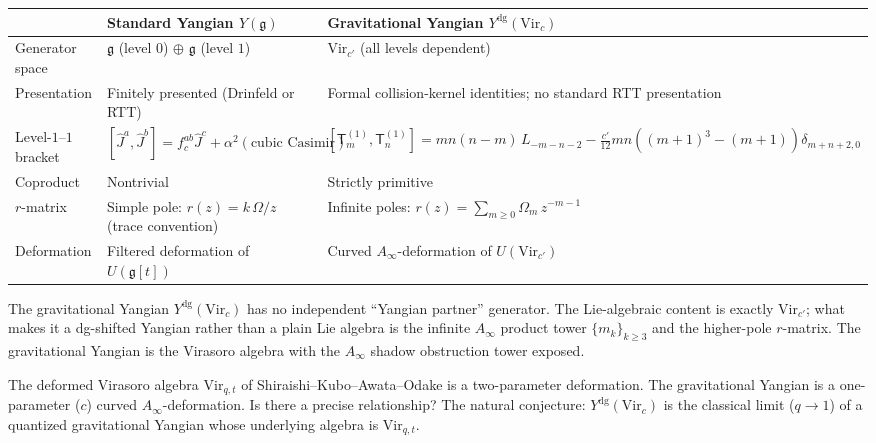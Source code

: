\documentclass[11pt]{article}
\newcommand{\fg}{\mathfrak{g}}
\begin{document}
\begin{center}
\renewcommand{\arraystretch}{1.4}
\small
\begin{tabular}{@{}p{3.2cm}p{5.4cm}p{5.4cm}@{}}
\toprule
& \textbf{Standard Yangian $Y(\fg)$}
& \textbf{Gravitational Yangian $Y^{\mathrm{dg}}(\mathrm{Vir}_c)$}
\\
\midrule
Generator space
& $\fg$ (level $0$) $\oplus$ $\fg$ (level $1$)
& $\mathrm{Vir}_{c'}$ (all levels dependent)
\\
Presentation
& Finitely presented (Drinfeld or RTT)
& Formal collision-kernel identities; no standard RTT presentation
\\
Level-$1$--$1$ bracket
& $[\hat{J}^a, \hat{J}^b] = f^{ab}_c\hat{J}^c
  + \alpha^2(\text{cubic Casimir})$
& $[\mathsf{T}_m^{(1)}, \mathsf{T}_n^{(1)}]
  = mn(n{-}m)\,L_{-m-n-2}
  - \frac{c'}{12}mn((m{+}1)^3{-}(m{+}1))\delta_{m+n+2,0}$
\\
Coproduct
& Nontrivial
& Strictly primitive
\\
$r$-matrix
& Simple pole: $r(z) = k\,\Omega/z$ \textup{(trace convention)}
& Infinite poles: $r(z) = \sum_{m \ge 0}\Omega_m\,z^{-m-1}$
\\
Deformation
& Filtered deformation of $U(\fg[t])$
& Curved $A_\infty$-deformation of $U(\mathrm{Vir}_{c'})$
\\
\bottomrule
\end{tabular}
\end{center}

\begin{observation}
The gravitational Yangian $Y^{\mathrm{dg}}(\mathrm{Vir}_c)$ has no
independent ``Yangian partner'' generator.  The Lie-algebraic content
is exactly $\mathrm{Vir}_{c'}$; what makes it a dg-shifted Yangian
rather than a plain Lie algebra is the infinite $A_\infty$ product
tower $\{m_k\}_{k \ge 3}$ and the higher-pole $r$-matrix.  The
gravitational Yangian is the Virasoro algebra with the $A_\infty$
shadow obstruction tower exposed.
\end{observation}

\begin{question}
The deformed Virasoro algebra $\mathrm{Vir}_{q,t}$ of
Shiraishi--Kubo--Awata--Odake is a two-parameter deformation.
The gravitational Yangian is a one-parameter ($c$) curved
$A_\infty$-deformation.  Is there a precise relationship?  The
natural conjecture: $Y^{\mathrm{dg}}(\mathrm{Vir}_c)$ is the
classical limit ($q \to 1$) of a quantized gravitational Yangian
whose underlying algebra is $\mathrm{Vir}_{q,t}$.
\end{question}
\end{document}
